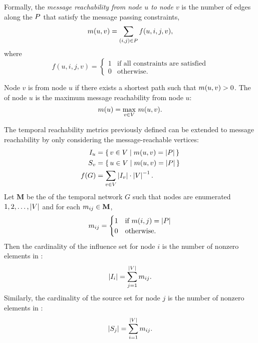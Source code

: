 Formally, the \emph{message reachability from node $u$ to node $v$} is the number of edges along the  $P$ that satisfy the message passing constraints,
%
\begin{equation*}
	m(u, v) = \sum_{(i, j) \in P} f(u, i, j, v),
\end{equation*}
%
where
%
\begin{equation*}
    f(u, i, j, v) = 
        \begin{cases}
            1 & \text{if all constraints are satisfied} \\ 
            0 & \text{otherwise.}
        \end{cases}
\end{equation*}

Node $v$ is  from node $u$ if there exists a shortest path such that $m(u, v) > 0$. The  of node $u$ is the maximum message reachability from node $u$:
%
\begin{equation}\label{eq:vreach}
	m(u) = \max_{v \in V} \, m(u, v).
\end{equation}

The temporal reachability metrics previously defined can be extended to message reachability by only considering the message-reachable vertices:
%
\begin{align*}
  I_u &= \set{ v \in V| m(u, v) = \left\vert P\right\vert} \\
  S_v &= \set{ u \in V| m(u, v) = \left\vert P\right\vert} \\
  f(G) &= \sum_{v \in V} \left\vert I_v \right\vert \cdot \left\vert V \right\vert^{-1}.
\end{align*}
%
Let $\mathbf{M}$ be the  of the temporal network $G$ such that nodes are enumerated $1, 2, \ldots, \left\vert V \right\vert$ and for each $m_{ij} \in \mathbf{M}$,
%
\begin{equation*}
  m_{ij} = 
    \begin{cases}
      1 & \text{if } m(i, j) = \left\vert P \right\vert \\
      0 & \text{otherwise.}
    \end{cases}
\end{equation*}
%
Then the cardinality of the influence set for node $i$ is the number of nonzero elements in :
%
\begin{equation}\label{eq:influence-size}
  \left\vert I_i \right\vert = \sum_{j=1}^{\left\vert V \right\vert} m_{ij} .
\end{equation}
%
Similarly, the cardinality of the source set for node $j$ is the number of nonzero elements in :
%
\begin{equation}\label{eq:source-size}
  \left\vert S_j \right\vert = \sum_{i=1}^{\left\vert V \right\vert} m_{ij} .
\end{equation}

